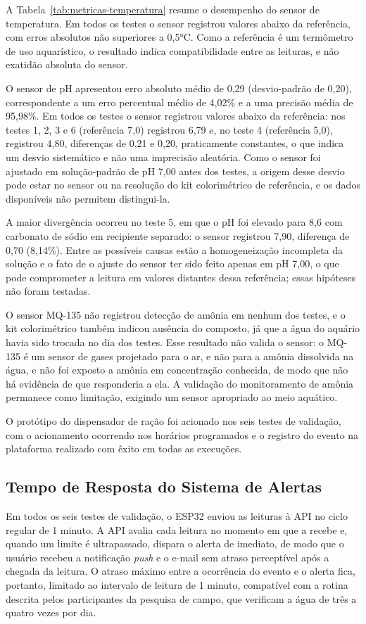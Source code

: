 \documentclass[11pt,a4paper]{article}
\begin{document}
A Tabela~\ref{tab:metricas-temperatura} resume o desempenho do sensor de temperatura. Em todos os testes o sensor registrou valores abaixo da referência, com erros absolutos não superiores a 0,5°C. Como a referência é um termômetro de uso aquarístico, o resultado indica compatibilidade entre as leituras, e não exatidão absoluta do sensor.

O sensor de pH apresentou erro absoluto médio de 0,29 (desvio-padrão de 0,20), correspondente a um erro percentual médio de 4,02\% e a uma precisão média de 95,98\%. Em todos os testes o sensor registrou valores abaixo da referência: nos testes 1, 2, 3 e 6 (referência 7,0) registrou 6,79 e, no teste 4 (referência 5,0), registrou 4,80, diferenças de 0,21 e 0,20, praticamente constantes, o que indica um desvio sistemático e não uma imprecisão aleatória. Como o sensor foi ajustado em solução-padrão de pH 7,00 antes dos testes, a origem desse desvio pode estar no sensor ou na resolução do kit colorimétrico de referência, e os dados disponíveis não permitem distingui-la.

A maior divergência ocorreu no teste 5, em que o pH foi elevado para 8,6 com carbonato de sódio em recipiente separado: o sensor registrou 7,90, diferença de 0,70 (8,14\%). Entre as possíveis causas estão a homogeneização incompleta da solução e o fato de o ajuste do sensor ter sido feito apenas em pH 7,00, o que pode comprometer a leitura em valores distantes dessa referência; essas hipóteses não foram testadas.

O sensor MQ-135 não registrou detecção de amônia em nenhum dos testes, e o kit colorimétrico também indicou ausência do composto, já que a água do aquário havia sido trocada no dia dos testes. Esse resultado não valida o sensor: o MQ-135 é um sensor de gases projetado para o ar, e não para a amônia dissolvida na água, e não foi exposto a amônia em concentração conhecida, de modo que não há evidência de que responderia a ela. A validação do monitoramento de amônia permanece como limitação, exigindo um sensor apropriado ao meio aquático.

O protótipo do dispensador de ração foi acionado nos seis testes de validação, com o acionamento ocorrendo nos horários programados e o registro do evento na plataforma realizado com êxito em todas as execuções.

\subsection{Tempo de Resposta do Sistema de Alertas}
Em todos os seis testes de validação, o ESP32 enviou as leituras à API no ciclo regular de 1 minuto. A API avalia cada leitura no momento em que a recebe e, quando um limite é ultrapassado, dispara o alerta de imediato, de modo que o usuário recebeu a notificação \textit{push} e o e-mail sem atraso perceptível após a chegada da leitura. O atraso máximo entre a ocorrência do evento e o alerta fica, portanto, limitado ao intervalo de leitura de 1 minuto, compatível com a rotina descrita pelos participantes da pesquisa de campo, que verificam a água de três a quatro vezes por dia.
\end{document}
